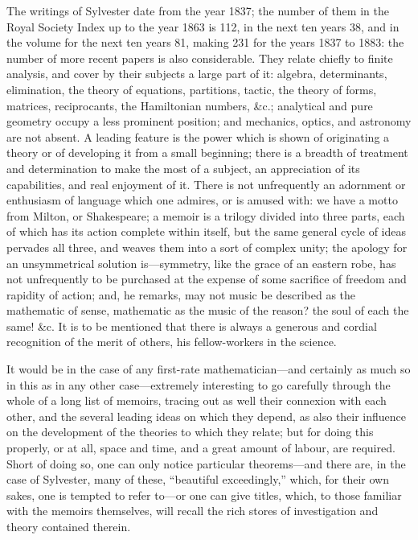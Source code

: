 \documentclass[11pt,a4paper]{article}
\begin{document}
The writings of Sylvester date from the year 1837; the number of them in the Royal Society Index up to the year 1863 is 112, in the next ten years 38, and in the volume for the next ten years 81, making 231 for the years 1837 to 1883: the number of more recent papers is also considerable. They relate chiefly to finite analysis, and cover by their subjects a large part of it: algebra, determinants, elimination, the theory of equations, partitions, tactic, the theory of forms, matrices, reciprocants, the Hamiltonian numbers, \&c.; analytical and pure geometry occupy a less prominent position; and mechanics, optics, and astronomy are not absent. A leading feature is the power which is shown of originating a theory or of developing it from a small beginning; there is a breadth of treatment and determination to make the most of a subject, an appreciation of its capabilities, and real enjoyment of it. There is not unfrequently an adornment or enthusiasm of language which one admires, or is amused with: we have a motto from Milton, or Shakespeare; a memoir is a trilogy divided into three parts, each of which has its action complete within itself, but the same general cycle of ideas pervades all three, and weaves them into a sort of complex unity; the apology for an unsymmetrical solution is---symmetry, like the grace of an eastern robe, has not unfrequently to be purchased at the expense of some sacrifice of freedom and rapidity of action; and, he remarks, may not music be described as the mathematic of sense, mathematic as the music of the reason? the soul of each the same! \&c. It is to be mentioned that there is always a generous and cordial recognition of the merit of others, his fellow-workers in the science.

It would be in the case of any first-rate mathematician---and certainly as much so in this as in any other case---extremely interesting to go carefully through the whole of a long list of memoirs, tracing out as well their connexion with each other, and the several leading ideas on which they depend, as also their influence on the development of the theories to which they relate; but for doing this properly, or at all, space and time, and a great amount of labour, are required. Short of doing so, one can only notice particular theorems---and there are, in the case of Sylvester, many of these, ``beautiful exceedingly,'' which, for their own sakes, one is tempted to refer to---or one can give titles, which, to those familiar with the memoirs themselves, will recall the rich stores of investigation and theory contained therein.
\end{document}
